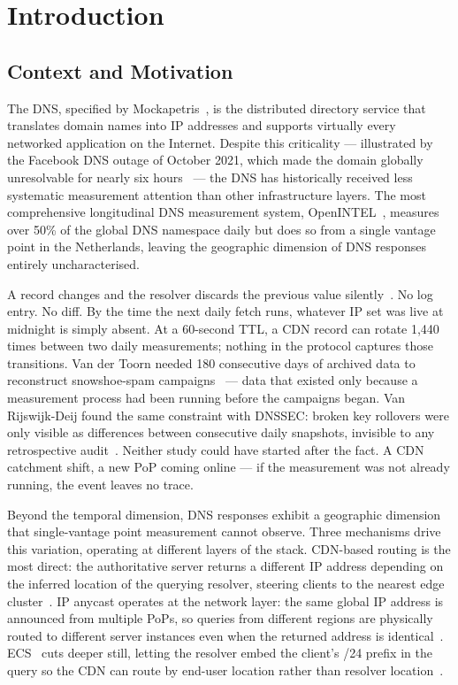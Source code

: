 \chapter{Introduction}
\label{ch:introduction}

\section{Context and Motivation}
\label{sec:1.1}

The \ac{DNS}, specified by Mockapetris~\cite{RFC1034,RFC1035}, is the distributed directory service that translates domain names into \ac{IP} addresses and supports virtually every networked application on the Internet. Despite this criticality — illustrated by the Facebook \ac{DNS} outage of October 2021, which made the domain globally unresolvable for nearly six hours~\cite{Xu2023} — the \ac{DNS} has historically received less systematic measurement attention than other infrastructure layers. The most comprehensive longitudinal \ac{DNS} measurement system, OpenINTEL~\cite{vanRijswijk2016}, measures over 50\% of the global \ac{DNS} namespace daily but does so from a single vantage point in the Netherlands, leaving the geographic dimension of \ac{DNS} responses entirely uncharacterised.

A record changes and the resolver discards the previous value silently~\cite{RFC1034,RFC1035}. No log entry. No diff. By the time the next daily fetch runs, whatever \ac{IP} set was live at midnight is simply absent. At a 60-second \ac{TTL}, a \ac{CDN} record can rotate 1,440 times between two daily measurements; nothing in the protocol captures those transitions. Van der Toorn needed 180 consecutive days of archived data to reconstruct snowshoe-spam campaigns~\cite{vanderToorn2018} --- data that existed only because a measurement process had been running before the campaigns began. Van Rijswijk-Deij found the same constraint with \ac{DNSSEC}: broken key rollovers were only visible as differences between consecutive daily snapshots, invisible to any retrospective audit~\cite{vanRijswijk2016}. Neither study could have started after the fact. A \ac{CDN} catchment shift, a new \ac{PoP} coming online --- if the measurement was not already running, the event leaves no trace.

Beyond the temporal dimension, \ac{DNS} responses exhibit a geographic dimension that single-vantage point measurement cannot observe. Three mechanisms drive this variation, operating at different layers of the stack. \ac{CDN}-based routing is the most direct: the authoritative server returns a different \ac{IP} address depending on the inferred location of the querying resolver, steering clients to the nearest edge cluster~\cite{Li2025,Hours2016}. \ac{IP} anycast operates at the network layer: the same global \ac{IP} address is announced from multiple \ac{PoPs}, so queries from different regions are physically routed to different server instances even when the returned address is identical~\cite{Bortzmeyer2013,Koch2021}. \ac{ECS}~\cite{RFC7871} cuts deeper still, letting the resolver embed the client's /24 prefix in the query so the \ac{CDN} can route by end-user location rather than resolver location~\cite{Wang2018}.

